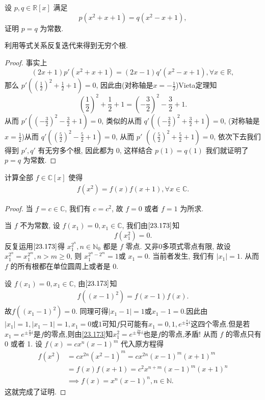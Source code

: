 \documentclass[../../main.tex]{subfiles}%
\begin{document}
\begin{example}
设 \( p,q \in \mathbb{R}[x] \) 满足
\[
p(x^2 + x + 1) = q(x^2 - x + 1),
\]
证明 \( p = q \) 为常数.
\end{example}
\begin{note}
利用等式关系反复迭代来得到无穷个根.
\end{note}
\begin{proof}
事实上
\[
(2x + 1)p'(x^2 + x + 1) = (2x - 1)q'(x^2 - x + 1), \forall x \in \mathbb{R},
\]
那么 \( p'\left( \left( \frac{1}{2} \right)^2 + \frac{1}{2} + 1 \right) = 0 \), 因此由(对称轴是$x=-\frac{1}{2}$)Vieta定理知
\[
\left( \frac{1}{2} \right)^2 + \frac{1}{2} + 1 = \left( -\frac{3}{2} \right)^2 - \frac{3}{2} + 1.
\]
从而 \( p'\left( \left( -\frac{3}{2} \right)^2 - \frac{3}{2} + 1 \right) = 0 \), 类似的从而 \( q'\left( \left( -\frac{3}{2} \right)^2 + \frac{3}{2} + 1 \right) = 0 \), (对称轴是$x=\frac{1}{2}$)从而 \( q'\left( \left( \frac{5}{2} \right)^2 - \frac{5}{2} + 1 \right) = 0 \), 从而 $p'$ $\left( \left( \frac{5}{2} \right)^2 + \frac{5}{2} + 1 \right) = 0$, 依次下去我们得到 \( p',q' \) 有无穷多个根, 因此都为 0, 这样结合 \( p(1) = q(1) \) 我们就证明了 \( p = q \) 为常数.
\end{proof}

\begin{example}
计算全部 \( f \in \mathbb{C}[x] \) 使得
\begin{align}
f(x^2) = f(x)f(x+1), \forall x \in \mathbb{C}. \label{23.173}
\end{align}
\end{example}
\begin{proof}
当 \( f = c \in \mathbb{C} \), 我们有 \( c = c^2 \), 故 \( f = 0 \) 或者 \( f = 1 \) 为所求.

当 \( f \) 不为常数, 设 \( f(x_1) = 0, x_1 \in \mathbb{C} \), 我们由\(\eqref{23.173}\)知
\[
f(x_1^2) = 0.
\]
反复运用\(\eqref{23.173}\)得 \( x_1^{2^n}, n \in \mathbb{N}_0 \) 都是 \( f \) 零点. 又非0多项式零点有限, 故设 \( x_1^{2^n} = x_1^{2^m}, n > m \geqslant 0 \), 则 \( x_1^{2^n - 2^m} = 1 \)或 \( x_1 = 0 \). 当前者发生, 我们有 \( |x_1| = 1 \). 从而 \( f \) 的所有根都在单位圆周上或者是 0.

设 \( f(x_1) = 0, x_1 \in \mathbb{C} \), 由\(\eqref{23.173}\)知 
\begin{align*}
f((x-1)^2)=f(x-1)f(x).
\end{align*}
故\( f\left( (x_1 - 1)^2 \right) = 0 \). 同理可得\( |x_1 - 1| = 1 \)或$x_1-1=0$.因此由$|x_1|=1,|x_1-1|=1,x_1=0\text{或}1$可知$f$只可能有$x_1=0,1,e^{\pm \frac{\pi}{3}i} $这四个零点.但是若$x_1=e^{\pm \frac{\pi}{3}i}$是$f$的零点,则由\eqref{23.173}知$x_1^2=e^{\pm \frac{2\pi}{3}i}$也是$f$的零点,矛盾!
从而 \( f \) 的零点只有 0 或者 1. 设 \( f(x) = cx^n(x - 1)^m \) 代入原方程得
\begin{align*}
f(x^2) &= cx^{2n}(x^2 - 1)^m = cx^{2n}(x - 1)^m(x + 1)^m \\
&= f(x)f(x+1) = c^2x^{n+m}(x - 1)^m(x + 1)^n \\
&\implies f(x) = x^n(x - 1)^n, n \in \mathbb{N}.
\end{align*}
这就完成了证明.
\end{proof}
\end{document}
